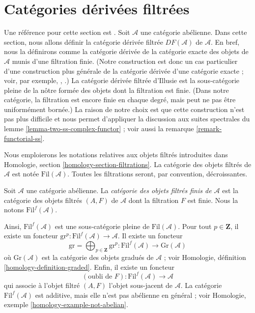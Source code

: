 \section{Catégories dérivées filtrées}
\label{section-filtered-derived-category}

\noindent
Une référence pour cette section est \cite[I, chapitre V]{cotangent}. Soit
$\mathcal{A}$ une catégorie abélienne. Dans cette section, nous allons définir
la catégorie dérivée filtrée $DF(\mathcal{A})$ de $\mathcal{A}$. En bref, nous
la définirons comme la catégorie dérivée de la catégorie exacte des objets de
$\mathcal{A}$ munis d'une filtration finie. (Notre construction est donc un
cas particulier d'une construction plus générale de la catégorie dérivée
d'une catégorie exacte ; voir, par exemple, \cite{Buhler}, \cite{Keller}.) La
catégorie dérivée filtrée d'Illusie est la sous-catégorie pleine de la nôtre
formée des objets dont la filtration est finie. (Dans notre catégorie, la
filtration est encore finie en chaque degré, mais peut ne pas être uniformément
bornée.) La raison de notre choix est que cette construction n'est pas plus
difficile et nous permet d'appliquer la discussion aux suites spectrales du
lemme \ref{lemma-two-ss-complex-functor} ; voir aussi la
remarque \ref{remark-functorial-ss}.

\medskip\noindent
Nous emploierons les notations relatives aux objets filtrés introduites dans
Homologie, section \ref{homology-section-filtrations}. La catégorie des objets
filtrés de $\mathcal{A}$ est notée $\text{Fil}(\mathcal{A})$. Toutes les
filtrations seront, par convention, décroissantes.

\begin{definition}
\label{definition-finite-filtered}
Soit $\mathcal{A}$ une catégorie abélienne. La
{\it catégorie des objets filtrés finis de $\mathcal{A}$} est la catégorie des
objets filtrés $(A, F)$ de $\mathcal{A}$ dont la filtration $F$ est finie. Nous
la notons $\text{Fil}^f(\mathcal{A})$.
\end{definition}

\noindent
Ainsi, $\text{Fil}^f(\mathcal{A})$ est une sous-catégorie pleine de
$\text{Fil}(\mathcal{A})$. Pour tout $p \in \mathbf{Z}$, il existe un foncteur
$\text{gr}^p : \text{Fil}^f(\mathcal{A}) \to \mathcal{A}$. Il existe un
foncteur
$$
\text{gr} = \bigoplus\nolimits_{p \in \mathbf{Z}} \text{gr}^p :
\text{Fil}^f(\mathcal{A}) \to \text{Gr}(\mathcal{A})
$$
où $\text{Gr}(\mathcal{A})$ est la catégorie des objets gradués de
$\mathcal{A}$ ; voir Homologie, définition
\ref{homology-definition-graded}. Enfin, il existe un foncteur
$$
(\text{oubli de }F) : \text{Fil}^f(\mathcal{A}) \longrightarrow \mathcal{A}
$$
qui associe à l'objet filtré $(A, F)$ l'objet sous-jacent de $\mathcal{A}$.
La catégorie $\text{Fil}^f(\mathcal{A})$ est additive, mais elle n'est pas
abélienne en général ; voir Homologie, exemple
\ref{homology-example-not-abelian}.

